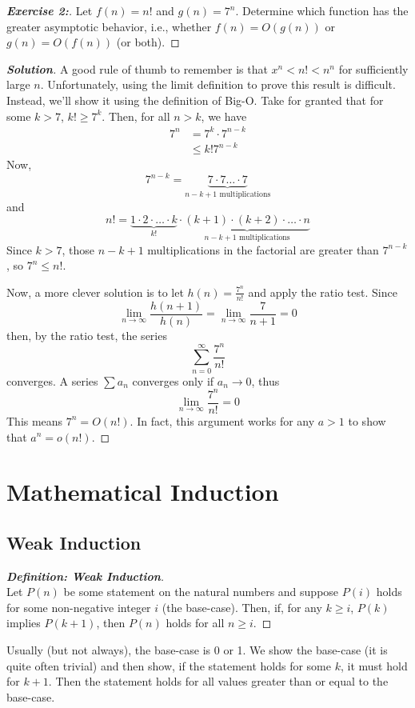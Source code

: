 \documentclass[a4paper]{article}
\newenvironment{solution}{\begin{proof}[\textnormal{\textbf{Solution}}]}{\end{proof}}
\newenvironment{exercise}[1]{\begin{proof}[\textnormal{\textbf{Exercise #1:}}]\phantom{\qedhere}}{\end{proof}}
\newenvironment{definition}[1]{\begin{proof}[\textnormal{\textbf{Definition: #1}}]\mbox{}\\\phantom{\qedhere}}{\end{proof}}
\theoremstyle{definition}
\begin{document}
 \begin{exercise}{2}
  Let $f(n)=n!$ and $g(n)=7^n$. Determine which function has the greater asymptotic behavior, i.e., whether $f(n)=O(g(n))$ or $g(n)=O(f(n))$ (or both).
 \end{exercise}
 
 \begin{solution}
  A good rule of thumb to remember is that $x^n<n!<n^n$ for sufficiently large $n$. Unfortunately, using the limit definition to prove this result is difficult. Instead, we'll show it using the definition of Big-O. Take for granted that for some $k>7$, $k!\geq 7^k$. Then, for all $n>k$, we have
  \begin{align*}
   7^n&=7^k\cdot 7^{n-k}\\&\leq k!7^{n-k}
  \end{align*}
  Now, \[7^{n-k}=\underbrace{7\cdot7\hdots\cdot7}_{n-k+1\text{ multiplications}}\] and \[n!=\underbrace{1\cdot2\cdot\hdots\cdot k}_{k!}\cdot\underbrace{(k+1)\cdot(k+2)\cdot\hdots\cdot n}_{n-k+1\text{ multiplications}}\] Since $k>7$, those $n-k+1$ multiplications in the factorial are greater than $7^{n-k}$, so $7^n\leq n!$.
  
  Now, a more clever solution is to let $h(n)=\frac{7^n}{n!}$ and apply the ratio test. Since \[\lim_{n\to\infty}\frac{h(n+1)}{h(n)}=\lim_{n\to\infty}\frac{7}{n+1}=0\] then, by the ratio test, the series \[\sum_{n=0}^{\infty}\frac{7^n}{n!}\] converges. A series $\sum a_n$ converges only if $a_n\to0$, thus \[\lim_{n\to\infty}\frac{7^n}{n!}=0\] This means $7^n=O(n!)$. In fact, this argument works for any $a>1$ to show that $a^n=o(n!)$. 
 \end{solution}

 \section{Mathematical Induction}
 \subsection{Weak Induction}
   \begin{definition}{Weak Induction}
   Let $P(n)$ be some statement on the natural numbers and suppose $P(i)$ holds for some non-negative integer $i$ (the base-case). Then, if, for any $k\geq i$, $P(k)$ implies $P(k+1)$, then $P(n)$ holds for all $n\geq i$.
   \end{definition}
   
   Usually (but not always), the base-case is 0 or 1. We show the base-case (it is quite often trivial) and then show, if the statement holds for some $k$, it must hold for $k+1$. Then the statement holds for all values greater than or equal to the base-case.
\end{document}
